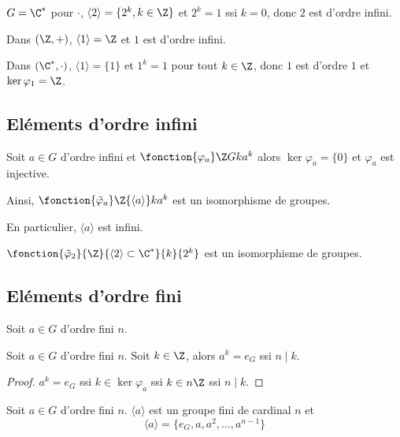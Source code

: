 \begin{exemple}
    $G = \C^*$ pour $\cdot$, $\langle 2 \rangle = \{2^k, k \in \Z\}$ et
    $2^k = 1$ ssi $k = 0$, donc $2$ est d'ordre infini.

    Dans $(\Z, +)$, $\langle 1 \rangle = \Z$ et $1$ est d'ordre infini.

    \avspace Dans $(\C^*, \cdot)$, $\langle 1 \rangle = \{1\}$ et
    $1^k = 1$ pour tout $k \in \Z$, donc $1$ est d'ordre $1$ et 
    $\ker \varphi_1 = \Z$.
\end{exemple}


\subsection{Eléments d'ordre infini}

\begin{proposition}{}{}
    Soit $a \in G$ d'ordre infini et $\fonction {\varphi_a} \Z G k {a^k}$ 
    alors $\ker \varphi_a = \{0\}$ et $\varphi_a$ est injective.

    Ainsi, $\fonction{\tilde \varphi_a} \Z {\langle a \rangle} k {a^k}$  est un 
    isomorphisme de groupes.

    En particulier, $\langle a \rangle$ est infini.
\end{proposition}

\begin{exemple}
    $\fonction{\tilde \varphi_2}{\Z}{\langle 2 \rangle \subset \C^*}{k}{2^k}$ est un isomorphisme de groupes.

\end{exemple}


\subsection{Eléments d'ordre fini}

Soit $a \in G$ d'ordre fini $n$.

\begin{proposition}{}{}
    Soit $a \in G$ d'ordre fini $n$.
    Soit $k \in \Z$, alors
    $a^k = e_G$ ssi $n \mid k$.
\end{proposition}

\begin{proof}
    $a^k = e_G$ ssi $k \in \ker \varphi_a$ ssi $k \in n \Z$ ssi $n \mid k$.
\end{proof}

\begin{proposition}{}{}
    Soit $a \in G$ d'ordre fini $n$.
    $\langle a \rangle$ est un groupe fini de cardinal $n$ et 
    $$\langle a \rangle = \{e_G, a, a^2, \ldots, a^{n-1}\}$$
\end{proposition}

